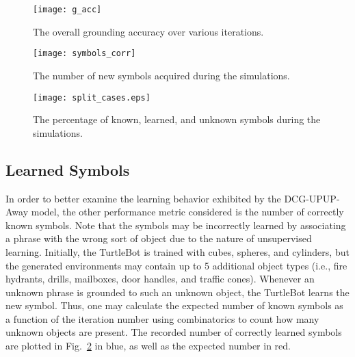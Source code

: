 \begin{figure}[htb!]
\centering
\texttt{[image: g\_acc]}
\caption{The overall grounding accuracy over various iterations.}
\label{fig:g_acc}
\end{figure}

\begin{figure}[htb!]
\centering
\texttt{[image: symbols\_corr]}
\caption{The number of new symbols acquired during the simulations.}
\label{fig:symbols}
\end{figure}

\begin{figure}[htb!]
\centering
\texttt{[image: split\_cases.eps]}
\caption{The percentage of known, learned, and unknown symbols during the simulations.}
\label{fig:g_acc_split}
\end{figure}




\subsection{Learned Symbols}
In order to better examine the learning behavior exhibited by the DCG-UPUP-Away model, the other performance metric considered is the number of correctly known symbols. Note that the symbols may be incorrectly learned by associating a phrase with the wrong sort of object due to the nature of unsupervised learning.
Initially, the TurtleBot is trained with cubes, spheres, and cylinders, but the generated environments may contain up to 5 additional object types (i.e., fire hydrants, drills, mailboxes, door handles, and traffic cones).
Whenever an unknown phrase is grounded to such an unknown object, the TurtleBot learns the new symbol.
Thus, one may calculate the expected number of known symbols as a function of the iteration number using combinatorics to count how many unknown objects are present.
The recorded number of correctly learned symbols are plotted in Fig.~\ref{fig:symbols} in blue, as well as the expected number in red.


